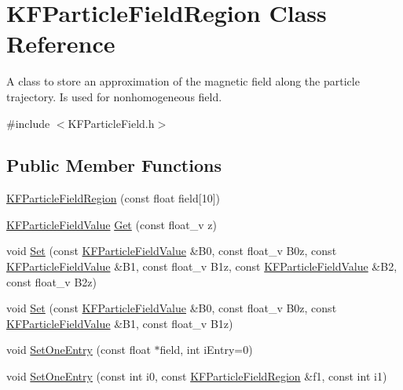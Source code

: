 \hypertarget{classKFParticleFieldRegion}{}\section{K\+F\+Particle\+Field\+Region Class Reference}
\label{classKFParticleFieldRegion}


A class to store an approximation of the magnetic field along the particle trajectory. Is used for nonhomogeneous field.  




{\ttfamily \#include $<$K\+F\+Particle\+Field.\+h$>$}

\subsection*{Public Member Functions}
\begin{DoxyCompactItemize}
\item 
\hyperlink{classKFParticleFieldRegion_a0a485ca50cc1cdc0fdbd9d7140d6fe5f}{K\+F\+Particle\+Field\+Region} (const float field\mbox{[}10\mbox{]})
\item 
\hyperlink{classKFParticleFieldValue}{K\+F\+Particle\+Field\+Value} \hyperlink{classKFParticleFieldRegion_afb370ebaa17c3a0623ba8d93b7a8b6f4}{Get} (const float\+\_\+v z)
\item 
void \hyperlink{classKFParticleFieldRegion_a76aab1581ecf506a47767fea0a841d8c}{Set} (const \hyperlink{classKFParticleFieldValue}{K\+F\+Particle\+Field\+Value} \&B0, const float\+\_\+v B0z, const \hyperlink{classKFParticleFieldValue}{K\+F\+Particle\+Field\+Value} \&B1, const float\+\_\+v B1z, const \hyperlink{classKFParticleFieldValue}{K\+F\+Particle\+Field\+Value} \&B2, const float\+\_\+v B2z)
\item 
void \hyperlink{classKFParticleFieldRegion_a399fa62a176c6c8fb19ca29a5d9546e8}{Set} (const \hyperlink{classKFParticleFieldValue}{K\+F\+Particle\+Field\+Value} \&B0, const float\+\_\+v B0z, const \hyperlink{classKFParticleFieldValue}{K\+F\+Particle\+Field\+Value} \&B1, const float\+\_\+v B1z)
\item 
void \hyperlink{classKFParticleFieldRegion_a41de884a13ba832ed317f0b734dc742b}{Set\+One\+Entry} (const float $\ast$field, int i\+Entry=0)
\item 
void \hyperlink{classKFParticleFieldRegion_ac8f036a0c60f0feced39c6e8d6d1835d}{Set\+One\+Entry} (const int i0, const \hyperlink{classKFParticleFieldRegion}{K\+F\+Particle\+Field\+Region} \&f1, const int i1)
\end{DoxyCompactItemize}
